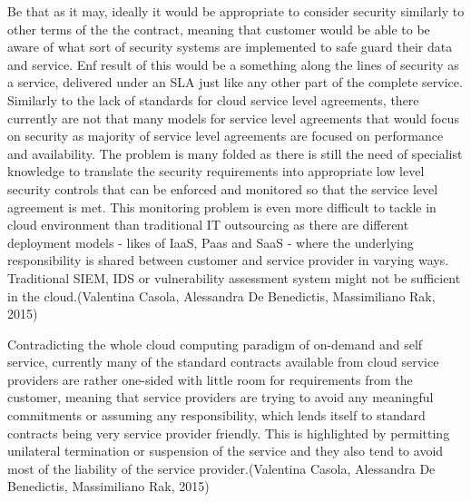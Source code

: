 \documentclass{article}
\begin{document}
Be that as it may, ideally it would be appropriate to consider security similarly to other terms of the the contract, meaning that customer would be able to be aware of what sort of security systems are implemented to safe guard their data and service. Enf result of this would be a something along the lines of security as a service, delivered under an SLA just like any other part of the complete service. Similarly to the lack of standards for cloud service level agreements, there currently are not that many models for service level agreements that would focus on security as majority of service level agreements are focused on performance and availability. The problem is many folded as there is still the need of specialist knowledge to translate the security requirements into appropriate low level security controls that can be enforced and monitored so that the service level agreement is met. This monitoring problem is even more difficult to tackle in cloud environment than traditional IT outsourcing as there are different deployment models - likes of IaaS, Paas and SaaS - where the underlying responsibility is shared between customer and service provider in varying ways. Traditional SIEM, IDS or vulnerability assessment system might not be sufficient in the cloud.(Valentina Casola, Alessandra De Benedictis, Massimiliano Rak, 2015)
\par
Contradicting the whole cloud computing paradigm of on-demand and self service, currently many of the standard contracts available from cloud service providers are rather one-sided with little room for requirements from the customer, meaning that service providers are trying to avoid any meaningful commitments or assuming any responsibility, which lends itself to standard contracts being very service provider friendly. This is highlighted by permitting unilateral termination or suspension of the service and they also tend to avoid most of the liability of the service provider.(Valentina Casola, Alessandra De Benedictis, Massimiliano Rak, 2015)
\end{document}
